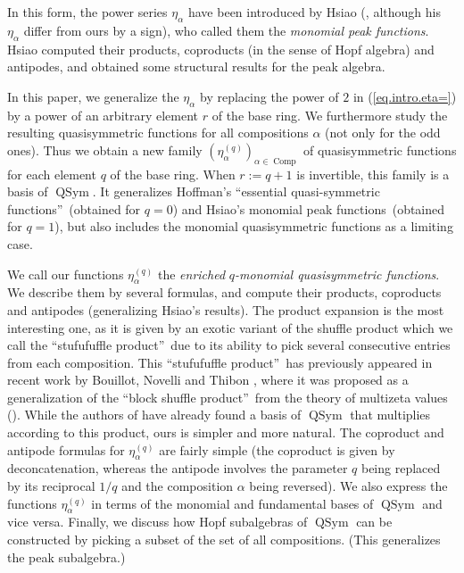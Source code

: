 \documentclass[numbers=enddot,12pt,final,onecolumn,notitlepage]{scrartcl}%
\theoremstyle{definition}
\begin{document}
In this form, the power series $\eta_{\alpha}$ have been introduced by Hsiao
(\cite[Proposition 2.1]{Hsiao07}, although his $\eta_{\alpha}$ differ from
ours by a sign), who called them the \textit{monomial peak functions}. Hsiao
computed their products, coproducts (in the sense of Hopf algebra) and
antipodes, and obtained some structural results for the peak algebra.

In this paper, we generalize the $\eta_{\alpha}$ by replacing the power of $2$
in (\ref{eq.intro.eta=}) by a power of an arbitrary element $r$ of the base
ring. We furthermore study the resulting quasisymmetric functions for all
compositions $\alpha$ (not only for the odd ones). Thus we obtain a new family
$\left(  \eta_{\alpha}^{\left(  q\right)  }\right)  _{\alpha\in
\operatorname*{Comp}}$ of quasisymmetric functions for each element $q$ of the
base ring. When $r:=q+1$ is invertible, this family is a basis of
$\operatorname*{QSym}$. It generalizes Hoffman's \textquotedblleft essential
quasi-symmetric functions\textquotedblright\ (obtained for $q=0$) and Hsiao's
monomial peak functions\ (obtained for $q=1$), but also includes the monomial
quasisymmetric functions as a limiting case.

We call our functions $\eta_{\alpha}^{\left(  q\right)  }$ the
\textit{enriched }$q$\textit{-monomial quasisymmetric functions}. We describe
them by several formulas, and compute their products, coproducts and antipodes
(generalizing Hsiao's results). The product expansion is the most interesting
one, as it is given by an exotic variant of the shuffle product which we call
the \textquotedblleft stufufuffle product\textquotedblright\ due to its
ability to pick several consecutive entries from each composition. This
\textquotedblleft stufufuffle product\textquotedblright\ has previously
appeared in recent work by Bouillot, Novelli and Thibon \cite[(1)]{BoNoTh22},
where it was proposed as a generalization of the \textquotedblleft block
shuffle product\textquotedblright\ from the theory of multizeta values
(\cite{HirSat22}). While the authors of \cite{BoNoTh22} have already found a
basis of $\operatorname*{QSym}$ that multiplies according to this product,
ours is simpler and more natural. The coproduct and antipode formulas for
$\eta_{\alpha}^{\left(  q\right)  }$ are fairly simple (the coproduct is given
by deconcatenation, whereas the antipode involves the parameter $q$ being
replaced by its reciprocal $1/q$ and the composition $\alpha$ being reversed).
We also express the functions $\eta_{\alpha}^{\left(  q\right)  }$ in terms of
the monomial and fundamental bases of $\operatorname*{QSym}$ and vice versa.
Finally, we discuss how Hopf subalgebras of $\operatorname*{QSym}$ can be
constructed by picking a subset of the set of all compositions. (This
generalizes the peak subalgebra.)
\end{document}

